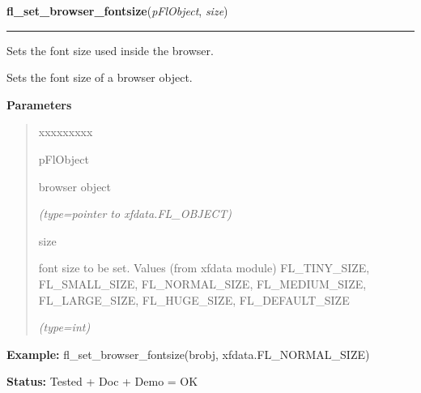 \hspace{.8\funcindent}\begin{boxedminipage}{\funcwidth}

    \raggedright \textbf{fl\_set\_browser\_fontsize}(\textit{pFlObject}, \textit{size})

    \vspace{-1.5ex}

    \rule{\textwidth}{0.5\fboxrule}
\setlength{\parskip}{2ex}
    Sets the font size used inside the browser.

    Sets the font size of a browser object.

\setlength{\parskip}{1ex}
      \textbf{Parameters}
      \vspace{-1ex}

      \begin{quote}
        \begin{Ventry}{xxxxxxxxx}

          \item[pFlObject]

          browser object

            {\it (type=pointer to xfdata.FL\_OBJECT)}

          \item[size]

          font size to be set. Values (from xfdata module) FL\_TINY\_SIZE, 
          FL\_SMALL\_SIZE, FL\_NORMAL\_SIZE, FL\_MEDIUM\_SIZE, 
          FL\_LARGE\_SIZE, FL\_HUGE\_SIZE, FL\_DEFAULT\_SIZE

            {\it (type=int)}

        \end{Ventry}

      \end{quote}

\textbf{Example:} fl\_set\_browser\_fontsize(brobj, xfdata.FL\_NORMAL\_SIZE)



\textbf{Status:} Tested + Doc + Demo = OK



    \end{boxedminipage}

    \label{xformslib:flbrowser:fl_set_browser_fontstyle}

    \vspace{0.5ex}

